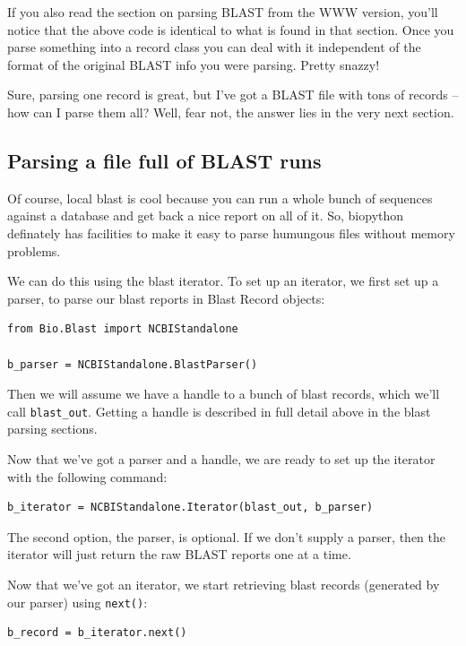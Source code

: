 \documentclass{report}
\begin{document}
If you also read the section on parsing BLAST from the WWW version, you'll notice that the above code is identical to what is found in that section. Once you parse something into a record class you can deal with it independent of the format of the original BLAST info you were parsing. Pretty snazzy!


Sure, parsing one record is great, but I've got a BLAST file with tons of records -- how can I parse them all? Well, fear not, the answer lies in the very next section.

\subsection{Parsing a file full of BLAST runs}

Of course, local blast is cool because you can run a whole bunch of sequences against a database and get back a nice report on all of it. So, biopython definately has facilities to make it easy to parse humungous files without memory problems. 


We can do this using the blast iterator. To set up an iterator, we first set up a parser, to parse our blast reports in Blast Record objects:

\begin{verbatim}
from Bio.Blast import NCBIStandalone

b_parser = NCBIStandalone.BlastParser()
\end{verbatim}

Then we will assume we have a handle to a bunch of blast records, which we'll call \verb|blast_out|. Getting a handle is described in full detail above in the blast parsing sections. 


Now that we've got a parser and a handle, we are ready to set up the iterator with the following command:

\begin{verbatim}
b_iterator = NCBIStandalone.Iterator(blast_out, b_parser)
\end{verbatim}

The second option, the parser, is optional. If we don't supply a parser, then the iterator will just return the raw BLAST reports one at a time.


Now that we've got an iterator, we start retrieving blast records (generated by our parser) using \verb|next()|:

\begin{verbatim}
b_record = b_iterator.next()
\end{verbatim}
\end{document}
